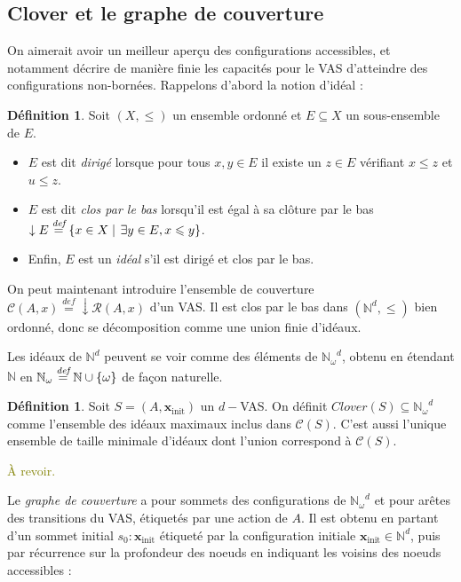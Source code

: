 \documentclass[a4paper,final]{article}
\theoremstyle{definition}
\newtheorem{Definition}[Theorem]{Définition}
\let\leq\leqslant
\newcommand{\lucas}[1]{\textcolor{olive}{#1}}
\newcommand{\set}[2]{\left\{#1\mathrel{\left|\vphantom{#1}\vphantom{#2}\right.}#2\right\}}
\newcommand{\os}[1]{\left\{\mathinner{#1}\right\}}
\newcommand{\defeq}{\ensuremath{\stackrel{\textit{def}}{=}}}
\let\union\cup
\newcommand{\N}{\ensuremath{\mathbb{N}}}
\newcommand{\Nomega}{\ensuremath{\mathbb{N}_\omega}}
\newcommand{\reach}{\ensuremath{\mathcal{R}}}
\newcommand{\cover}{\ensuremath{\mathcal{C}}}
\newcommand{\clover}{\textit{Clover}}
\newcommand{\vect}[1]{\ensuremath{\mathbf{#1}}}
\newcommand{\xinit}{\ensuremath{\vect{x}_\text{init}}}
\begin{document}
\subsection{Clover et le graphe de couverture}

On aimerait avoir un meilleur aperçu des configurations accessibles, et notamment décrire de manière finie les capacités pour le VAS d'atteindre des configurations non-bornées.
Rappelons d'abord la notion d'idéal :

\begin{Definition}
Soit $(X,\leq)$ un ensemble ordonné et $E\subseteq X$ un sous-ensemble de $E$.
\begin{itemize}
    \item $E$ est dit \emph{dirigé} lorsque pour tous $x,y\in E$ il existe un $z\in E$ vérifiant $x\leq z$ et $u\leq z$.
    \item $E$ est dit \emph{clos par le bas} lorsqu'il est égal à sa clôture par le bas $\downarrow E \defeq \set{x\in X}{\exists y\in E, x\leq y}$.
    \item Enfin, $E$ est un \emph{idéal} s'il est dirigé et clos par le bas.
\end{itemize}
\end{Definition}

On peut maintenant introduire l'ensemble de couverture $\cover(A,x) \defeq \downarrow \reach(A,x)$ d'un VAS.
Il est clos par le bas dans $(\N^d,\leq)$ bien ordonné, donc se décomposition comme une union finie d'idéaux.

Les idéaux de $\N^d$ peuvent se voir comme des éléments de $\Nomega^d$, obtenu en étendant $\N$ en $\Nomega\defeq \N\union\os{\omega}$ de façon naturelle. %

\begin{Definition}
Soit $S=(A,\xinit)$ un $d-$VAS.
On définit $\clover(S) \subseteq \Nomega^d$ comme l'ensemble des idéaux maximaux inclus dans $\cover(S)$.
C'est aussi l'unique ensemble de taille minimale d'idéaux dont l'union correspond à $\cover(S)$.
\end{Definition}


\lucas{À revoir.}

Le \emph{graphe de couverture} a pour sommets des configurations de $\Nomega^d$ et pour arêtes des transitions du VAS, étiquetés par une action de $A$.
Il est obtenu en partant d'un sommet initial $s_0:\xinit$ étiqueté par la configuration initiale $\xinit\in \N^d$, puis par récurrence sur la profondeur des noeuds en indiquant les voisins des noeuds accessibles :
\end{document}
